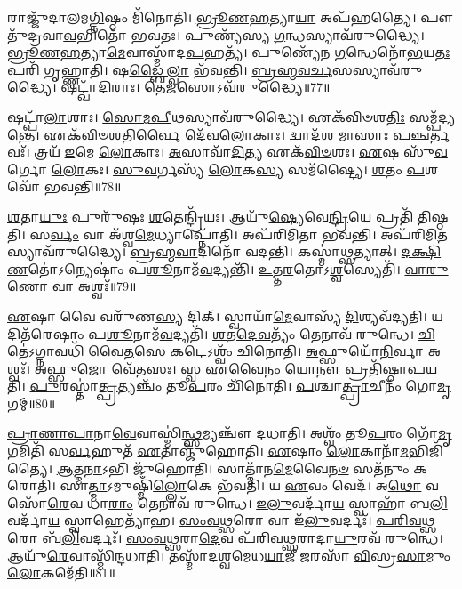 𑌰𑌾𑌜𑍍𑌜𑍁᳴𑌦𑌾𑌲𑌮\-\ul{𑌗𑍍𑌨𑌿}\-𑌷𑍍𑌠𑌂 𑌮𑌿᳴𑌨𑍋𑌤𑌿।
\-\ul{𑌭𑍍𑌰𑍂}\-\-\ul{𑌣}\-\-\ul{𑌹}\-𑌤𑍍𑌯𑌾\-\ul{𑌯𑌾} 𑌅𑌪᳴𑌹𑌤𑍍𑌯𑍈।
𑌪𑍗𑌤𑍁᳴𑌦𑍍𑌰𑌵𑌾\-\ul{𑌵}\-𑌭𑌿𑌤𑍋᳴ 𑌭𑌵𑌤𑌃।
𑌪𑍁𑌣𑍍𑌯᳴𑌸𑍍𑌯 \ul{𑌗}\-𑌨𑍍𑌧𑌸𑍍𑌯𑌾𑌵᳴𑌰𑍁𑌦𑍍𑌧𑍍𑌯𑍈।
\-\ul{𑌭𑍍𑌰𑍂}\-\-\ul{𑌣}\-\-\ul{𑌹}\-𑌤𑍍𑌯𑌾\-\-\ul{𑌮𑍇}\-𑌵𑌾\-𑌸𑍍𑌮𑌾᳴𑌦\-\ul{𑌪}\-𑌹𑌤𑍍𑌯᳴।
𑌪𑍁𑌣𑍍𑌯𑍇᳴𑌨 \ul{𑌗}\-𑌨𑍍𑌧𑍇𑌨𑍋᳴\-\ul{𑌭}\-𑌯\-\ul{𑌤𑌃} 𑌪𑌰𑌿᳴ 𑌗𑍃𑌹𑍍𑌣𑌾𑌤𑌿।
𑌷\-\ul{𑌡𑍍𑌬𑍈}\-\-\ul{𑌲𑍍}\-𑌵𑌾 𑌭᳴𑌵𑌨𑍍𑌤𑌿।
\-\ul{𑌬𑍍𑌰}\-\-\ul{𑌹𑍍𑌮}\-\-\ul{𑌵}\-\-\ul{𑌰𑍍𑌚}\-𑌸𑌸𑍍𑌯𑌾𑌵᳴𑌰𑍁𑌦𑍍𑌧𑍍𑌯𑍈।
𑌷𑌟𑍍𑌖𑌾᳴\-\ul{𑌦𑌿}\-𑌰𑌾𑌃।
𑌤𑍇\-\ul{𑌜}\-𑌸𑍋\-𑌽𑌵᳴𑌰𑍁𑌦𑍍𑌧𑍍𑌯𑍈॥77॥

𑌷𑌟𑍍𑌪𑌾᳴\-\ul{𑌲𑌾}\-𑌶𑌾𑌃।
\-\ul{𑌸𑍋}\-\-\ul{𑌮}\-\-\ul{𑌪𑍀}\-𑌥𑌸𑍍𑌯𑌾𑌵᳴𑌰𑍁𑌦𑍍𑌧𑍍𑌯𑍈।
𑌏𑌕᳴𑌵𑌿𑍞𑌶\-\ul{𑌤𑌿𑌃} 𑌸𑌮𑍍𑌪᳴𑌦𑍍𑌯𑌨𑍍𑌤𑍇।
𑌏𑌕᳴𑌵𑌿𑍞𑌶\-\ul{𑌤𑌿}\-𑌰𑍍𑌵𑍈 𑌦𑍇᳴𑌵\-\ul{𑌲𑍋}\-𑌕𑌾𑌃।
𑌦𑍍𑌵𑌾𑌦᳴\-\ul{𑌶} 𑌮𑌾\-\ul{𑌸𑌾𑌃} 𑌪\-\ul{𑌞𑍍𑌚}\-𑌰𑍍𑌤𑌵𑌃᳴।
𑌤𑍍𑌰𑌯᳴ \ul{𑌇}\-𑌮𑍇 \ul{𑌲𑍋}\-𑌕𑌾𑌃।
\-\ul{𑌅}\-𑌸𑌾𑌵𑌾᳴\-\ul{𑌦𑌿}\-𑌤𑍍𑌯 𑌏𑌕᳴\-\ul{𑌵𑌿}\-\-\ul{𑍞}\-𑌶𑌃।
\-\ul{𑌏}\-𑌷 𑌸𑍁᳴\-\ul{𑌵}\-𑌰𑍍𑌗𑍋 \ul{𑌲𑍋}\-𑌕𑌃।
\-\ul{𑌸𑍁}\-\-\ul{𑌵}\-𑌰𑍍𑌗𑌸𑍍𑌯᳴ \ul{𑌲𑍋}\-𑌕\-\ul{𑌸𑍍𑌯} 𑌸𑌮᳴𑌷𑍍𑌟𑍍𑌯𑍈।
\-\ul{𑌶}\-𑌤𑌂 \ul{𑌪}\-𑌶𑌵𑍋᳴ 𑌭𑌵𑌨𑍍𑌤𑌿॥78॥

\-\ul{𑌶}\-𑌤𑌾\-\ul{𑌯𑍁𑌃} 𑌪𑍁𑌰𑍁᳴𑌷𑌃 \ul{𑌶}\-𑌤𑍇𑌨𑍍𑌦𑍍𑌰𑌿᳴𑌯𑌃।
𑌆𑌯𑍁᳴\-\ul{𑌷𑍍𑌯𑍇}\-𑌵𑍇\-\ul{𑌨𑍍𑌦𑍍𑌰𑌿}\-𑌯𑍇 𑌪𑍍𑌰𑌤𑌿᳴ 𑌤𑌿𑌷𑍍𑌠𑌤𑌿।
𑌸\-\ul{𑌰𑍍𑌵𑌂} 𑌵𑌾 𑌅᳴𑌶𑍍𑌵\-\ul{𑌮𑍇}\-𑌧𑍍𑌯𑌾𑌪𑍍𑌨𑍋᳴𑌤𑌿।
𑌅𑌪᳴𑌰𑌿𑌮𑌿𑌤𑌾 𑌭𑌵𑌨𑍍𑌤𑌿।
𑌅𑌪᳴𑌰𑌿𑌮𑌿\-\ul{𑌤}\-𑌸𑍍𑌯𑌾𑌵᳴𑌰𑍁𑌦𑍍𑌧𑍍𑌯𑍈।
\-\ul{𑌬𑍍𑌰}\-\-\ul{𑌹𑍍𑌮}\-\-\ul{𑌵𑌾}\-𑌦𑌿𑌨𑍋᳴ 𑌵𑌦𑌨𑍍𑌤𑌿।
𑌕𑌸𑍍𑌮𑌾॑\-\ul{𑌥𑍍𑌸}\-𑌤𑍍𑌯𑌾𑌤𑍍।
\-\ul{𑌦}\-\-\ul{𑌕𑍍𑌷𑌿}\-\-\ul{𑌣}\-𑌤𑍋॑\-𑌽𑌨𑍍𑌯𑍇𑌷𑌾𑌂॑ 𑌪\-\ul{𑌶𑍂}\-𑌨𑌾𑌮᳴\-\ul{𑌵}\-𑌦𑍍𑌯𑌨𑍍𑌤𑌿᳴।
\-\ul{𑌉}\-\-\ul{𑌤𑍍𑌤}\-\-\ul{𑌰}\-𑌤𑍋\-𑌽\-\ul{𑌶𑍍𑌵}\-𑌸𑍍𑌯𑍇𑌤𑌿᳴।
\-\ul{𑌵𑌾}\-\-\ul{𑌰𑍁}\-𑌣𑍋 𑌵𑌾 𑌅𑌶𑍍𑌵𑌃᳴॥79॥

\-\ul{𑌏}\-𑌷𑌾 𑌵𑍈 𑌵𑌰𑍁᳴𑌣\-\ul{𑌸𑍍𑌯} 𑌦𑌿𑌕𑍍।
𑌸𑍍𑌵𑌾𑌯𑌾᳴\-\ul{𑌮𑍇}\-𑌵𑌾𑌸𑍍𑌯᳴ \ul{𑌦𑌿}\-𑌶𑍍𑌯𑌵᳴𑌦𑍍𑌯𑌤𑌿।
𑌯𑌦𑌿𑌤᳴𑌰𑍇𑌷𑌾𑌂 𑌪\-\ul{𑌶𑍂}\-𑌨𑌾𑌮᳴\-\ul{𑌵}\-𑌦𑍍𑌯𑌤𑌿᳴।
\-\ul{𑌶}\-\-\ul{𑌤}\-\-\ul{𑌦𑍇}\-\-\ul{𑌵}\-𑌤𑍍𑌯𑌂᳴ 𑌤𑍇𑌨𑌾𑌵᳴ 𑌰𑍁𑌨𑍍𑌧𑍇।
\-\ul{𑌚𑌿}\-𑌤𑍇॑\-𑌽𑌗𑍍𑌨𑌾𑌵𑌧𑌿᳴ 𑌵𑍈\-\ul{𑌤}\-𑌸𑍇 𑌕𑌟𑍇\-𑌽𑌶𑍍𑌵𑌂᳴ 𑌚𑌿𑌨𑍋𑌤𑌿।
\-\ul{𑌅}\-𑌫𑍍𑌸𑍁𑌯𑍋᳴\-\ul{𑌨𑌿}\-𑌰𑍍𑌵𑌾 𑌅𑌶𑍍𑌵𑌃᳴।
\-\ul{𑌅}\-\-\ul{𑌫𑍍𑌸𑍁}\-𑌜𑍋 𑌵𑍇᳴\-\ul{𑌤}\-𑌸𑌃।
𑌸𑍍𑌵 \ul{𑌏}\-𑌵𑍈\-\ul{𑌨𑌂} 𑌯𑍋\-\ul{𑌨𑍗} 𑌪𑍍𑌰𑌤𑌿᳴\-𑌷𑍍𑌠𑌾𑌪𑌯𑌤𑌿।
\-\ul{𑌪𑍁}\-𑌰𑌸𑍍𑌤𑌾॑\-\ul{𑌤𑍍𑌪𑍍𑌰}\-𑌤𑍍𑌯𑌞𑍍𑌚𑌂᳴ 𑌤𑍂\-\ul{𑌪}\-𑌰𑌂 𑌚𑌿᳴𑌨𑍋𑌤𑌿।
\-\ul{𑌪}\-𑌶𑍍𑌚𑌾\-\ul{𑌤𑍍𑌪𑍍𑌰𑌾}\-𑌚𑍀𑌨𑌂᳴ 𑌗𑍋\-\ul{𑌮𑍃}\-𑌗𑌮𑍍॥80॥

\-\ul{𑌪𑍍𑌰𑌾}\-\-\ul{𑌣𑌾}\-\-\ul{𑌪𑌾}\-𑌨𑌾\-\ul{𑌵𑍇}\-𑌵𑌾𑌸𑍍𑌮𑌿॑\-\ul{𑌨𑍍𑌥𑍍𑌸}\-𑌮𑍍𑌯𑌞𑍍𑌚𑍗᳴ 𑌦𑌧𑌾𑌤𑌿।
𑌅𑌶𑍍𑌵𑌂᳴ 𑌤𑍂\-\ul{𑌪}\-𑌰𑌂 𑌗𑍋᳴\-\ul{𑌮𑍃}\-𑌗𑌮𑌿𑌤𑌿᳴ 𑌸\-\ul{𑌰𑍍𑌵}\-𑌹𑍁𑌤᳴ \ul{𑌏}\-𑌤𑌾𑌞𑍍𑌜𑍁᳴𑌹𑍋𑌤𑌿।
\-\ul{𑌏}\-𑌷𑌾𑌂 \ul{𑌲𑍋}\-𑌕𑌾𑌨𑌾᳴\-\ul{𑌮}\-𑌭𑌿𑌜𑌿᳴𑌤𑍍𑌯𑍈।
\-\ul{𑌆}\-𑌤𑍍𑌮\-\ul{𑌨𑌾}\-𑌽𑌭𑌿 𑌜𑍁᳴𑌹𑍋𑌤𑌿।
𑌸𑌾𑌤𑍍𑌮𑌾᳴𑌨\-\ul{𑌮𑍇}\-𑌵𑍈\-\ul{𑌨}\-\-\ul{𑍞} 𑌸𑌤᳴𑌨𑍁𑌂 𑌕𑌰𑍋𑌤𑌿।
𑌸𑌾\-\ul{𑌤𑍍𑌮𑌾}\-\-𑌽𑌮𑍁𑌷𑍍𑌮𑌿𑌁᳴\-\ul{𑌲𑍍𑌲𑍋}\-𑌕𑍇 𑌭᳴𑌵𑌤𑌿।
𑌯 \ul{𑌏}\-𑌵𑌂 𑌵𑍇𑌦᳴।
𑌅\-\ul{𑌥𑍋} 𑌵𑌸𑍋᳴\-\ul{𑌰𑍇}\-𑌵 𑌧𑌾\-\ul{𑌰𑌾𑌂} 𑌤𑍇𑌨𑌾𑌵᳴ 𑌰𑍁𑌨𑍍𑌧𑍇।
\-\ul{𑌇}\-\-\ul{𑌲𑍁}\-𑌵𑌰𑍍𑌦𑌾᳴\-\ul{𑌯} 𑌸𑍍𑌵𑌾𑌹𑌾᳴ 𑌬\-\ul{𑌲𑌿}\-𑌵𑌰𑍍𑌦𑌾᳴\-\ul{𑌯} 𑌸𑍍𑌵𑌾𑌹𑍇𑌤𑍍𑌯𑌾᳴𑌹।
\-\ul{𑌸𑌂}\-\-\ul{𑌵}\-\-\ul{𑌥𑍍𑌸}\-𑌰𑍋 𑌵𑌾 𑌇᳴\-\ul{𑌲𑍁}\-𑌵𑌰𑍍𑌦𑌃᳴।
\-\ul{𑌪}\-\-\ul{𑌰𑌿}\-\-\ul{𑌵}\-\-\ul{𑌥𑍍𑌸}\-𑌰𑍋 𑌬᳴\-\ul{𑌲𑌿}\-𑌵𑌰𑍍𑌦𑌃᳴।
\-\ul{𑌸𑌂}\-\-\ul{𑌵}\-\-\ul{𑌥𑍍𑌸}\-𑌰𑌾\-\ul{𑌦𑍇}\-𑌵 𑌪᳴𑌰𑌿𑌵\-\ul{𑌥𑍍𑌸}\-𑌰𑌾𑌦𑌾\-\ul{𑌯𑍁}\-𑌰𑌵᳴ 𑌰𑍁𑌨𑍍𑌧𑍇।
𑌆𑌯𑍁᳴\-\ul{𑌰𑍇}\-𑌵𑌾𑌸𑍍𑌮𑌿᳴𑌨𑍍𑌦𑌧𑌾𑌤𑌿।
𑌤𑌸𑍍𑌮𑌾᳴𑌦𑌶𑍍𑌵𑌮𑍇𑌧\-\ul{𑌯𑌾}\-𑌜𑍀 \ul{𑌜}\-𑌰𑌸𑌾᳴ \ul{𑌵𑌿}\-𑌸𑍍𑌰\-\ul{𑌸𑌾}\-𑌮𑍁𑌂 \ul{𑌲𑍋}\-𑌕𑌮𑍇᳴𑌤𑌿॥81॥\anuvakamend[𑌤𑍇\-\ul{𑌜}\-𑌸𑍋\-𑌽𑌵᳴𑌰𑍁𑌦𑍍𑌧𑍍𑌯𑍈 𑌭\-\ul{𑌵}\-𑌨𑍍𑌤𑍍𑌯𑌶𑍍𑌵𑍋᳴ 𑌗𑍋\-\ul{𑌮𑍃}\-𑌗𑌮𑌿᳴\-\ul{𑌲𑍁}\-𑌵𑌰𑍍𑌦᳴\-\ul{𑌶𑍍𑌚}\-𑌤𑍍𑌵𑌾𑌰𑌿᳴ 𑌚]

